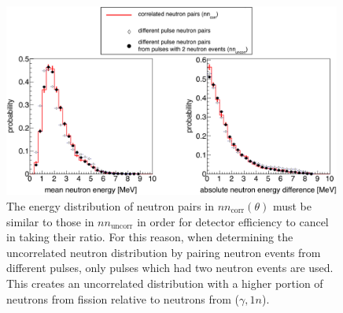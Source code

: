 \begin{figure}[]
\centering
    \includegraphics[width=0.99\textwidth]{Content/Methods/erg_dist(thesis).png}
    \caption{
    The energy distribution of neutron pairs in $nn_{\text{corr}}(\theta)$ must be similar to those in $nn_{\text{uncorr}}$ in order for detector efficiency to cancel in taking their ratio.
    For this reason, when determining the uncorrelated neutron distribution by pairing neutron events from different pulses, only pulses which had two neutron events are used.
    This creates an uncorrelated distribution with a higher portion of neutrons from fission relative to neutrons from ($\gamma, 1n$).
    }
    \label{fig:erg_distributions}
\end{figure}

